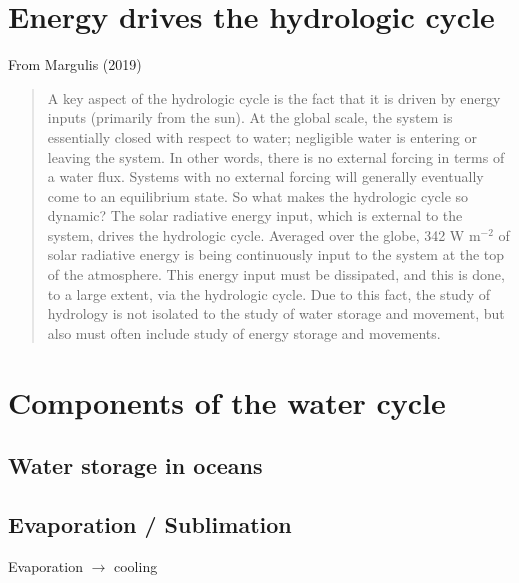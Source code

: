 \documentclass[
  letterpaper,
  DIV=11,
  numbers=noendperiod]{scrreprt}
\begin{document}
\hypertarget{energy-drives-the-hydrologic-cycle}{%
\section{Energy drives the hydrologic
cycle}\label{energy-drives-the-hydrologic-cycle}}

From Margulis (2019)

\begin{quote}
A key aspect of the hydrologic cycle is the fact that it is driven by
energy inputs (primarily from the sun). At the global scale, the system
is essentially closed with respect to water; negligible water is
entering or leaving the system. In other words, there is no external
forcing in terms of a water flux. Systems with no external forcing will
generally eventually come to an equilibrium state. So what makes the
hydrologic cycle so dynamic? The solar radiative energy input, which is
external to the system, drives the hydrologic cycle. Averaged over the
globe, 342 W m\(^{-2}\) of solar radiative energy is being continuously
input to the system at the top of the atmosphere. This energy input must
be dissipated, and this is done, to a large extent, via the hydrologic
cycle. Due to this fact, the study of hydrology is not isolated to the
study of water storage and movement, but also must often include study
of energy storage and movements.
\end{quote}

\hypertarget{components-of-the-water-cycle}{%
\section{Components of the water
cycle}\label{components-of-the-water-cycle}}

\hypertarget{water-storage-in-oceans}{%
\subsection{Water storage in oceans}\label{water-storage-in-oceans}}

\hypertarget{evaporation-sublimation}{%
\subsection{Evaporation / Sublimation}\label{evaporation-sublimation}}

Evaporation \(\longrightarrow\) cooling
\end{document}

